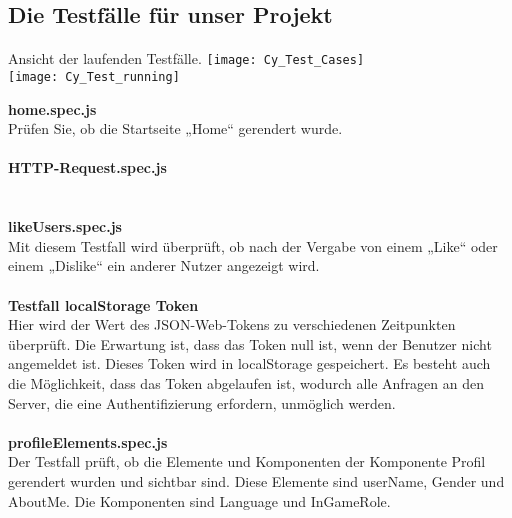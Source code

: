\subsection{Die Testfälle für unser Projekt}
\paragraph{}
Ansicht der laufenden Testfälle.
\texttt{[image: Cy\_Test\_Cases]}\label{fig:Cy_Test_Cases}
\\
\texttt{[image: Cy\_Test\_running]}\label{fig:Cy_Test_running}

\newpage
\textbf{home.spec.js}\\
Prüfen Sie, ob die Startseite „Home“ gerendert wurde.
\\\\
\textbf{HTTP-Request.spec.js}\\
\\\\
\textbf{likeUsers.spec.js}\\
Mit diesem Testfall wird überprüft, ob nach der Vergabe von einem „Like“ oder einem „Dislike“ ein anderer Nutzer angezeigt wird.
\\\\
\textbf{Testfall localStorage Token}\\
Hier wird der Wert des JSON-Web-Tokens zu verschiedenen Zeitpunkten überprüft.
Die Erwartung ist, dass das Token null ist, wenn der Benutzer nicht angemeldet ist.
Dieses Token wird in localStorage gespeichert.
Es besteht auch die Möglichkeit, dass das Token abgelaufen ist, wodurch alle Anfragen an den Server, die eine Authentifizierung erfordern, unmöglich werden.
\\\\
\textbf{profileElements.spec.js}\\
Der Testfall prüft, ob die Elemente und Komponenten der Komponente Profil gerendert wurden und sichtbar sind. Diese Elemente sind userName, Gender und AboutMe. Die Komponenten sind Language und InGameRole.

